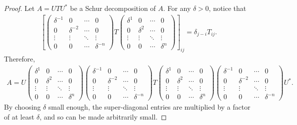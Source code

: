 \begin{proof}
    Let $A = UTU^{*}$ be a Schur decomposition of $A$. For any $\delta > 0$, notice that
    \begin{align*}
        \left[\begin{pmatrix}
            \delta^{-1} & 0 & \cdots & 0 \\
            0 & \delta^{-2} & \cdots & 0 \\
            \vdots & \vdots & \ddots & \vdots \\
            0 & 0 & \cdots & \delta^{-n}
        \end{pmatrix}T\begin{pmatrix}
            \delta^{1} & 0 & \cdots & 0 \\
            0 & \delta^{2} & \cdots & 0 \\
            \vdots & \vdots & \ddots & \vdots \\
            0 & 0 & \cdots & \delta^{n}
        \end{pmatrix}\right]_{ij} = \delta_{j-i}T_{ij}.
    \end{align*}
    Therefore,
    \begin{align*}
        A = U\begin{pmatrix}
            \delta^{1} & 0 & \cdots & 0 \\
            0 & \delta^{2} & \cdots & 0 \\
            \vdots & \vdots & \ddots & \vdots \\
            0 & 0 & \cdots & \delta^{n}
        \end{pmatrix}\begin{pmatrix}
            \delta^{-1} & 0 & \cdots & 0 \\
            0 & \delta^{-2} & \cdots & 0 \\
            \vdots & \vdots & \ddots & \vdots \\
            0 & 0 & \cdots & \delta^{-n}
        \end{pmatrix}T\begin{pmatrix}
            \delta^{1} & 0 & \cdots & 0 \\
            0 & \delta^{2} & \cdots & 0 \\
            \vdots & \vdots & \ddots & \vdots \\
            0 & 0 & \cdots & \delta^{n}
        \end{pmatrix}\begin{pmatrix}
            \delta^{-1} & 0 & \cdots & 0 \\
            0 & \delta^{-2} & \cdots & 0 \\
            \vdots & \vdots & \ddots & \vdots \\
            0 & 0 & \cdots & \delta^{-n}
        \end{pmatrix}U^{*}.
    \end{align*}
    By choosing $\delta$ small enough, the super-diagonal entries are multiplied by a factor of at least $\delta$, and so can be made arbitrarily small.
\end{proof}

